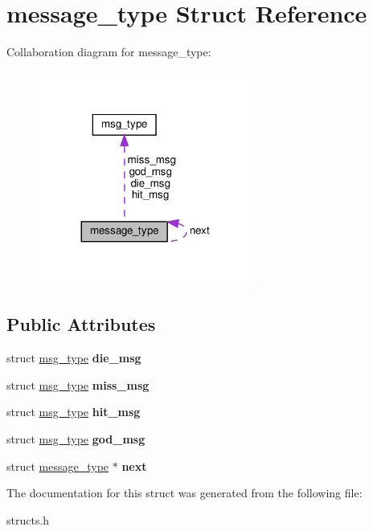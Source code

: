 \hypertarget{structmessage__type}{}\section{message\+\_\+type Struct Reference}
\label{structmessage__type}


Collaboration diagram for message\+\_\+type\+:
\nopagebreak
\begin{figure}[H]
\begin{center}
\leavevmode
\includegraphics[width=200pt]{structmessage__type__coll__graph}
\end{center}
\end{figure}
\subsection*{Public Attributes}
\begin{DoxyCompactItemize}
\item 
\mbox{\label{structmessage__type_a80133b1d5675854fbf911df074e17290}} 
struct \hyperlink{structmsg__type}{msg\+\_\+type} {\bfseries die\+\_\+msg}
\item 
\mbox{\label{structmessage__type_ad17635689f46c02c4e09f3c38a06a796}} 
struct \hyperlink{structmsg__type}{msg\+\_\+type} {\bfseries miss\+\_\+msg}
\item 
\mbox{\label{structmessage__type_ad9bb87d7fe2057fd8fffb7cbcdd7f59c}} 
struct \hyperlink{structmsg__type}{msg\+\_\+type} {\bfseries hit\+\_\+msg}
\item 
\mbox{\label{structmessage__type_ac5ad50968cab26b2471918bef0af98e8}} 
struct \hyperlink{structmsg__type}{msg\+\_\+type} {\bfseries god\+\_\+msg}
\item 
\mbox{\label{structmessage__type_ab057ca90031d1883592f0437e9ef0db6}} 
struct \hyperlink{structmessage__type}{message\+\_\+type} $\ast$ {\bfseries next}
\end{DoxyCompactItemize}


The documentation for this struct was generated from the following file\+:\begin{DoxyCompactItemize}
\item 
structs.\+h\end{DoxyCompactItemize}
